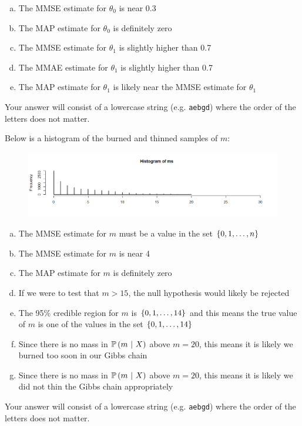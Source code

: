 \documentclass[12pt,landscape]{article}
\newcommand{\instr}{\small Your answer will consist of a lowercase string (e.g. \texttt{aebgd}) where the order of the letters does not matter. \normalsize}
\begin{document}
\vspace{-1.2cm}\benum{} 

\begin{enumerate}[(a)]
\item The MMSE estimate for $\theta_0$ is near 0.3
\item The MAP estimate for $\theta_0$ is definitely zero
\item The MMSE estimate for $\theta_1$ is slightly higher than 0.7
\item The MMAE estimate for $\theta_1$ is slightly higher than 0.7
\item The MAP estimate for $\theta_1$ is likely near the MMSE estimate for $\theta_1$
\end{enumerate}
\eenum\instr\pagebreak


\problem{}  Below is a histogram of the burned and thinned samples of $m$:

\vspace{-0.3cm}
\begin{figure}[h]
\centering
\includegraphics[width=8in]{ms.png}
\end{figure}

\vspace{-1.2cm}\benum{} 

\begin{enumerate}[(a)]
\item The MMSE estimate for $m$ must be a value in the set $\left\{0, 1, \ldots, n\right\}$
\item The MMSE estimate for $m$ is near 4
\item The MAP estimate for $m$ is definitely zero
\item If we were to test that $m > 15$, the null hypothesis would likely be rejected
\item The 95\% credible region for $m$ is $\left\{0, 1, \ldots, 14\right\}$ and this means the true value of $m$ is one of the values in the set $\left\{0, 1, \ldots, 14\right\}$
\item Since there is no mass in $\mathbb{P}\left(m~|~X\right)$ above $m=20$, this means it is likely we burned too soon in our Gibbs chain
\item Since there is no mass in $\mathbb{P}\left(m~|~X\right)$ above $m=20$, this means it is likely we did not thin the Gibbs chain appropriately
\end{enumerate}
\eenum\instr\pagebreak
\end{document}
